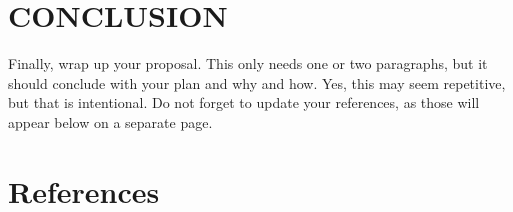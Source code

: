 \documentclass[12pt]{article}
\begin{document}
\section{CONCLUSION}
Finally, wrap up your proposal. This only needs one or two paragraphs, but it should conclude with your plan and why and how. Yes, this may seem repetitive, but that is intentional. Do not forget to update your references, as those will appear below on a separate page.

\newpage
\section*{References}
\printbibliography[heading=subbibintoc]
%
%
\end{document}
